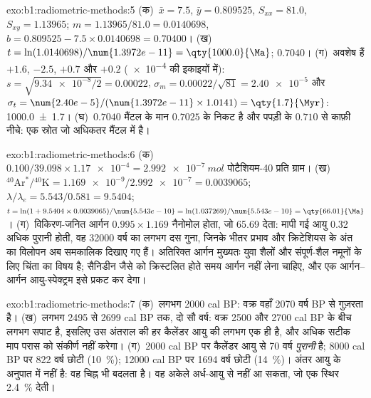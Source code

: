 \begin{solution}{exo:b1:radiometric-methods:5}
(क)~$\bar x = 7.5$, $\bar y = 0.809525$, $S_{xx} = 81.0$, $S_{xy} = 1.13965$; $m = 1.13965/81.0 = 0.0140698$, $b = 0.809525 - 7.5 \times 0.0140698 = 0.70400$। (ख)~$t = \ln(1.0140698)/\num{1.3972e-11} = \qty{1000.0}{\Ma}$;  $0.7040$। (ग)~अवशेष हैं $+1.6$, $-2.5$, $+0.7$ और $+0.2$ (\num{e-4} की इकाइयों में): $s = \sqrt{\num{9.34e-8}/2} = 0.00022$, $\sigma_m = 0.00022/\sqrt{81}
= \num{2.40e-5}$ और $\sigma_t = \num{2.40e-5}/(\num{1.3972e-11} \times 1.0141) =
\qty{1.7}{\Myr}$: \qty[uncertainty-mode=separate]{1000.0(17)}{\Ma}। (घ)~$0.7040$ मैंटल के मान $0.7025$ के निकट है और पपड़ी के $0.710$ से काफ़ी नीचे: एक स्रोत जो अधिकतर मैंटल में है।
\end{solution}

\begin{solution}{exo:b1:radiometric-methods:6}
(क)~$0.100/39.098 \times \num{1.17e-4} = \qty{2.992e-7}{mol}$ पोटैशियम-40 प्रति ग्राम। (ख)~${}^{40}\mathrm{Ar}^*/{}^{40}\mathrm{K} = \num{1.169e-9}/\num{2.992e-7}
= 0.0039065$; $\lambda/\lambda_e = 5.543/0.581 = 9.5404$; $t = \ln(1 + 9.5404
\times 0.0039065)/\num{5.543e-10} = \ln(1.037269)/\num{5.543e-10} =
\qty{66.01}{\Ma}$। (ग)~विकिरण-जनित आर्गन $0.995 \times 1.169$ नैनोमोल होता, जो \qty{65.69}{\Ma} देता: मापी गई आयु \qty{0.32}{\Myr} अधिक पुरानी होती, वह \num{32000} वर्ष का लगभग दस गुना, जिनके भीतर प्रभाव और क्रिटेशियस के अंत का विलोपन अब समकालिक दिखाए गए हैं। अतिरिक्त आर्गन मुख्यतः युवा शैलों और संपूर्ण-शैल नमूनों के लिए चिंता का विषय है; सैनिडीन जैसे  को क्रिस्टलित होते समय आर्गन नहीं लेना चाहिए, और एक आर्गन–आर्गन आयु-स्पेक्ट्रम इसे प्रकट कर देगा।
\end{solution}

\begin{solution}{exo:b1:radiometric-methods:7}
(क)~लगभग \num{2000} cal BP: वक्र वहाँ \num{2070} वर्ष BP से गुज़रता है। (ख)~लगभग \num{2495} से \num{2699} cal BP तक, दो सौ वर्ष: वक्र \num{2500} और \num{2700} cal BP के बीच लगभग सपाट है, इसलिए उस अंतराल की हर कैलेंडर आयु की  लगभग एक ही है, और अधिक सटीक माप परास को संकीर्ण नहीं करेगा। (ग)~\num{2000} cal BP पर  कैलेंडर आयु से \num{70} वर्ष \emph{पुरानी} है; \num{8000} cal BP पर \num{822} वर्ष छोटी (\qty{10}{\percent}); \num{12000} cal BP पर \num{1694} वर्ष छोटी (\qty{14}{\percent})। अंतर आयु के अनुपात में नहीं है: वह चिह्न भी बदलता है। वह अकेले अर्ध-आयु से नहीं आ सकता, जो एक स्थिर \qty{2.4}{\percent} देती।
\end{solution}

